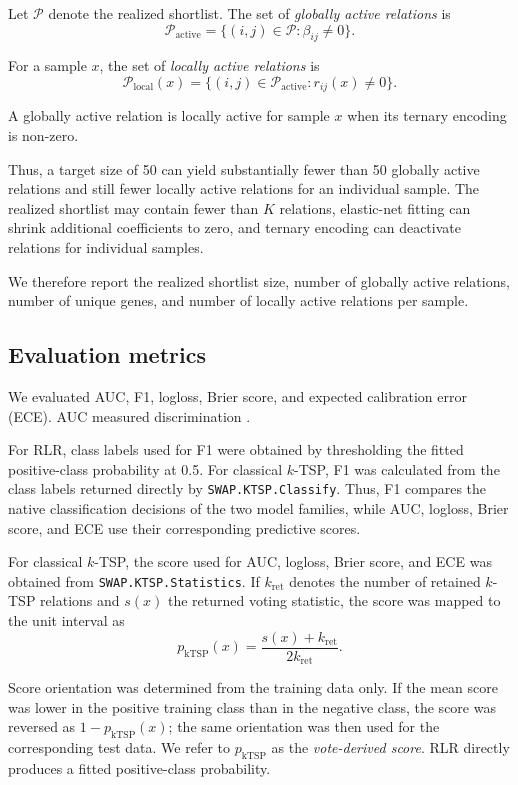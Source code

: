 \documentclass[preprint,12pt,a4paper]{elsarticle}
\begin{document}
Let $\mathcal{P}$ denote the realized shortlist. The set of \emph{globally active relations} is
\[
\mathcal{P}_{\mathrm{active}}
=
\{(i,j)\in\mathcal{P}:\beta_{ij}\neq 0\}.
\]

For a sample $x$, the set of \emph{locally active relations} is
\[
\mathcal{P}_{\mathrm{local}}(x)
=
\{(i,j)\in\mathcal{P}_{\mathrm{active}}:
r_{ij}(x)\neq 0\}.
\]

A globally active relation is locally active for sample $x$ when its ternary encoding is non-zero.

Thus, a target size of 50 can yield substantially fewer than 50 globally active relations and still fewer locally active relations for an individual sample. The realized shortlist may contain fewer than $K$ relations, elastic-net fitting can shrink additional coefficients to zero, and ternary encoding can deactivate relations for individual samples.

We therefore report the realized shortlist size, number of globally active relations, number of unique genes, and number of locally active relations per sample.

\subsection{Evaluation metrics}

We evaluated AUC, F1, logloss, Brier score, and expected calibration error (ECE). AUC measured discrimination \cite{Hanley1982}.

For RLR, class labels used for F1 were obtained by thresholding the fitted positive-class probability at 0.5. For classical $k$-TSP, F1 was calculated from the class labels returned directly by \texttt{SWAP.KTSP.Classify}. Thus, F1 compares the native classification decisions of the two model families, while AUC, logloss, Brier score, and ECE use their corresponding predictive scores.

For classical $k$-TSP, the score used for AUC, logloss, Brier score, and ECE was obtained from \texttt{SWAP.KTSP.Statistics}. If $k_{\mathrm{ret}}$ denotes the number of retained $k$-TSP relations and $s(x)$ the returned voting statistic, the score was mapped to the unit interval as
\[
p_{\mathrm{kTSP}}(x)
=
\frac{s(x)+k_{\mathrm{ret}}}{2k_{\mathrm{ret}}}.
\]

Score orientation was determined from the training data only. If the mean score was lower in the positive training class than in the negative class, the score was reversed as $1-p_{\mathrm{kTSP}}(x)$; the same orientation was then used for the corresponding test data. We refer to $p_{\mathrm{kTSP}}$ as the \emph{vote-derived score}. RLR directly produces a fitted positive-class probability.
\end{document}
